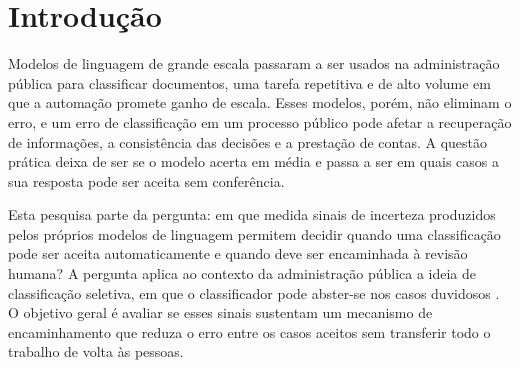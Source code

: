 
\section{Introdução}

Modelos de linguagem de grande escala passaram a ser usados na administração
pública para classificar documentos, uma tarefa repetitiva e de alto volume em
que a automação promete ganho de escala. Esses modelos, porém, não eliminam o
erro, e um erro de classificação em um processo público pode afetar a
recuperação de informações, a consistência das decisões e a prestação de
contas. A questão prática deixa de ser se o modelo acerta em média e passa a
ser em quais casos a sua resposta pode ser aceita sem conferência.

Esta pesquisa parte da pergunta: em que medida sinais de incerteza produzidos
pelos próprios modelos de linguagem permitem decidir quando uma classificação
pode ser aceita automaticamente e quando deve ser encaminhada à revisão
humana? A pergunta aplica ao contexto da administração pública a ideia de
classificação seletiva, em que o classificador pode abster-se nos casos
duvidosos \parencite{elyaniv2010}. O objetivo geral é avaliar se esses sinais
sustentam um mecanismo de encaminhamento que reduza o erro entre os casos
aceitos sem transferir todo o trabalho de volta às pessoas.
